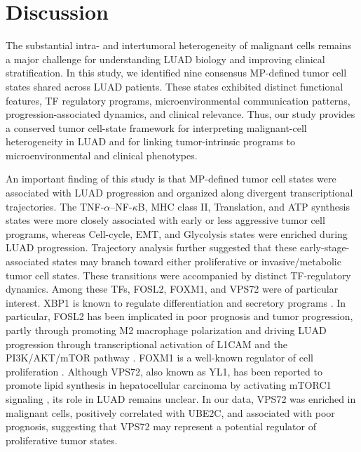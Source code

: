 \documentclass[pdflatex,sn-mathphys-num]{sn-jnl}%
\theoremstyle{thmstyleone}%
\theoremstyle{thmstyletwo}%
\theoremstyle{thmstylethree}%
\begin{document}
\section{Discussion}\label{sec12}

The substantial intra- and intertumoral heterogeneity of malignant cells remains a major challenge for understanding LUAD biology and improving clinical stratification. In this study, we identified nine consensus MP-defined tumor cell states shared across LUAD patients. These states exhibited distinct functional features, TF regulatory programs, microenvironmental communication patterns, progression-associated dynamics, and clinical relevance. Thus, our study provides a conserved tumor cell-state framework for interpreting malignant-cell heterogeneity in LUAD and for linking tumor-intrinsic programs to microenvironmental and clinical phenotypes.

An important finding of this study is that MP-defined tumor cell states were associated with LUAD progression and organized along divergent transcriptional trajectories. The TNF-\(\alpha\)--NF-\(\kappa\)B, MHC class II, Translation, and ATP synthesis states were more closely associated with early or less aggressive tumor cell programs, whereas Cell-cycle, EMT, and Glycolysis states were enriched during LUAD progression. Trajectory analysis further suggested that these early-stage-associated states may branch toward either proliferative or invasive/metabolic tumor cell states. These transitions were accompanied by distinct TF-regulatory dynamics. Among these TFs, FOSL2, FOXM1, and VPS72 were of particular interest. XBP1 is known to regulate differentiation and secretory programs \cite{bib47}. In particular, FOSL2 has been implicated in poor prognosis and tumor progression, partly through promoting M2 macrophage polarization \cite{bib48} and driving LUAD progression through transcriptional activation of L1CAM and the PI3K/AKT/mTOR pathway \cite{bib49}. FOXM1 is a well-known regulator of cell proliferation \cite{bib50}. Although VPS72, also known as YL1, has been reported to promote lipid synthesis in hepatocellular carcinoma by activating mTORC1 signaling \cite{bib51}, its role in LUAD remains unclear. In our data, VPS72 was enriched in malignant cells, positively correlated with UBE2C, and associated with poor prognosis, suggesting that VPS72 may represent a potential regulator of proliferative tumor states.
\end{document}
